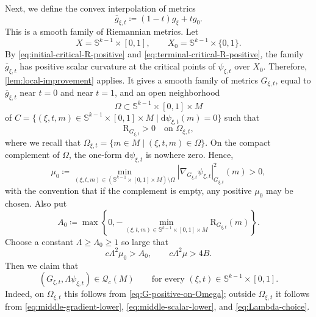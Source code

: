 \documentclass[11pt]{amsart}
\numberwithin{equation}{section}
\newcommand{\scal}{\mathrm{R}}
\newcommand{\Q}{\mathcal Q}
\let\geq\geqslant
\begin{document}
Next, we define the convex interpolation of metrics
\begin{equation}\label{eq:metric-interpolation}
 \overline g_{\xi,t}\coloneqq (1-t)g_\xi+t g_0.
\end{equation}
This is a smooth family of Riemannian metrics. 
Let
\[
 X=\mathbb S^{k-1}\times[0,1], \qquad X_0=\mathbb S^{k-1}\times\{0,1\}.
\]
By \eqref{eq:initial-critical-R-positive} and \eqref{eq:terminal-critical-R-positive}, the family
$\overline g_{\xi,t}$ has positive scalar curvature at the critical points of $\psi_{\xi,t}$ over $X_0$.
Therefore, \cref{lem:local-improvement} applies. 
It gives a smooth family of metrics $G_{\xi,t}$, equal to $\overline g_{\xi,t}$ near $t=0$ and near $t=1$, and an open neighborhood
\[
 \Omega\subset \mathbb S^{k-1}\times[0,1]\times M
\]
of $C=\{(\xi,t,m)\in \mathbb S^{k-1}\times[0,1]\times M \mid \mathrm{d}\psi_{\xi,t}(m)=0\}$ such that
\begin{equation}\label{eq:G-positive-on-Omega}
 \scal_{G_{\xi,t}}>0\quad\text{on }\Omega_{\xi,t},
\end{equation}
where we recall that $\Omega_{\xi,t}= \{m\in M \mid (\xi,t,m)\in\Omega\}$. On the compact complement of $\Omega$, the one-form $\mathrm{d}\psi_{\xi,t}$ is nowhere zero. 
Hence,
\begin{equation}\label{eq:middle-gradient-lower}
 \mu_0\coloneqq \min_{(\xi,t,m)\in (\mathbb S^{k-1}\times[0,1]\times M)\setminus\Omega}|\nabla_{G_{\xi,t}}\psi_{\xi,t}|_{G_{\xi,t}}^2(m)>0,
\end{equation}
with the convention that if the complement is empty, any positive $\mu_0$ may be chosen. 
Also put
\begin{equation}\label{eq:middle-scalar-lower}
 A_0\coloneqq \max\left\{0,-\min_{(\xi,t,m)\in\mathbb S^{k-1}\times[0,1]\times M}\scal_{G_{\xi,t}}(m)\right\}.
\end{equation}
Choose a constant $\Lambda\geq \Lambda_0\geq 1$ so large that
\begin{equation}\label{eq:Lambda-choice}
 c\Lambda^2\mu_0>A_0,
 \qquad
 c\Lambda^2\mu>4B.
\end{equation}
Then we claim that
\begin{equation}\label{eq:middle-in-Q}
 (G_{\xi,t},\Lambda\psi_{\xi,t})\in\Q_c(M)
 \qquad\text{for every }(\xi,t)\in \mathbb S^{k-1}\times[0,1].
\end{equation}
Indeed, on $\Omega_{\xi,t}$ this follows from \eqref{eq:G-positive-on-Omega}; outside $\Omega_{\xi,t}$ it follows
from \eqref{eq:middle-gradient-lower}, \eqref{eq:middle-scalar-lower}, and \eqref{eq:Lambda-choice}.
\end{document}
